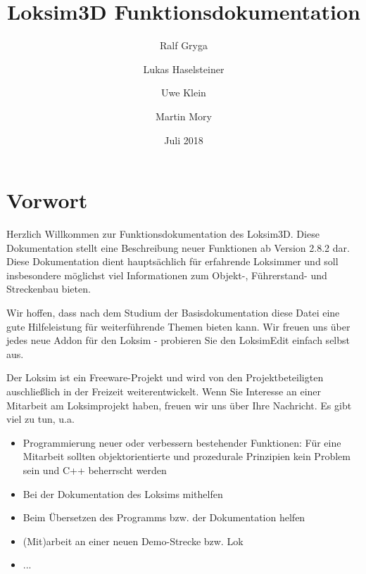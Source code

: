 \documentclass[11pt, a4paper]{refrep}
\begin{document}
\author{Ralf Gryga \and Lukas Haselsteiner \and Uwe Klein \and Martin Mory} 
\title{Loksim3D Funktionsdokumentation} 
\date{Juli 2018} 

\maketitle


\chapter{Vorwort}
Herzlich Willkommen zur Funktionsdokumentation des Loksim3D. Diese
Dokumentation stellt eine Beschreibung neuer Funktionen ab
Version 2.8.2 dar. Diese Dokumentation dient hauptsächlich für erfahrende Loksimmer 
und soll insbesondere möglichst viel Informationen zum
Objekt-, Führerstand- und Streckenbau bieten.

Wir hoffen, dass nach dem Studium der Basisdokumentation diese Datei
eine gute Hilfeleistung für weiterführende Themen bieten kann. Wir
freuen uns über jedes neue Addon für den Loksim - probieren Sie den
LoksimEdit einfach selbst aus.

Der Loksim ist ein Freeware-Projekt und wird von den Projektbeteiligten
auschließlich in der Freizeit weiterentwickelt. Wenn Sie Interesse an
einer Mitarbeit am Loksimprojekt haben, freuen wir uns über Ihre
Nachricht. Es gibt viel zu tun, u.a.

\begin{itemize}
\item
  Programmierung neuer oder verbessern bestehender Funktionen: 
  Für eine Mitarbeit sollten objektorientierte und prozedurale 
  Prinzipien kein Problem sein und C++ beherrscht werden
\item
  Bei der Dokumentation des Loksims mithelfen
\item
  Beim Übersetzen des Programms bzw. der Dokumentation helfen
\item 
  (Mit)arbeit an einer neuen Demo-Strecke bzw. Lok
\item ...
\end{itemize}

\clearpage

\tableofcontents 

\clearpage


\end{document}
